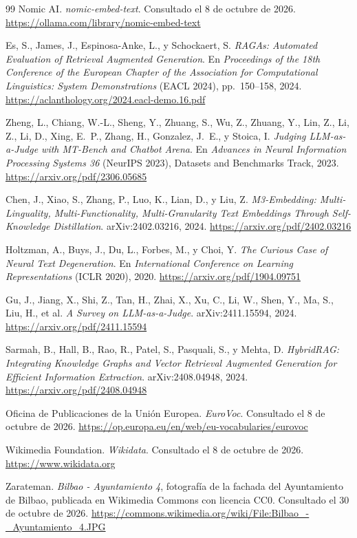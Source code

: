 \documentclass[11pt, a4paper]{report}
\begin{document}
\begin{thebibliography}{99}
		Nomic AI.
		\textit{nomic-embed-text}. Consultado el 8 de octubre de 2026.
		\url{https://ollama.com/library/nomic-embed-text}

		Es, S., James, J., Espinosa-Anke, L., y Schockaert, S.
		\textit{RAGAs: Automated Evaluation of Retrieval Augmented
		Generation}. En \textit{Proceedings of the 18th Conference of the
		European Chapter of the Association for Computational Linguistics:
		System Demonstrations} (EACL 2024), pp.~150--158, 2024.
		\url{https://aclanthology.org/2024.eacl-demo.16.pdf}

		Zheng, L., Chiang, W.-L., Sheng, Y., Zhuang, S., Wu, Z., Zhuang, Y.,
		Lin, Z., Li, Z., Li, D., Xing, E.~P., Zhang, H., Gonzalez, J.~E., y
		Stoica, I.
		\textit{Judging LLM-as-a-Judge with MT-Bench and Chatbot Arena}. En
		\textit{Advances in Neural Information Processing Systems 36}
		(NeurIPS 2023), Datasets and Benchmarks Track, 2023.
		\url{https://arxiv.org/pdf/2306.05685}

		Chen, J., Xiao, S., Zhang, P., Luo, K., Lian, D., y Liu, Z.
		\textit{M3-Embedding: Multi-Linguality, Multi-Functionality,
		Multi-Granularity Text Embeddings Through Self-Knowledge
		Distillation}. arXiv:2402.03216, 2024.
		\url{https://arxiv.org/pdf/2402.03216}

		Holtzman, A., Buys, J., Du, L., Forbes, M., y Choi, Y.
		\textit{The Curious Case of Neural Text Degeneration}. En
		\textit{International Conference on Learning Representations} (ICLR
		2020), 2020.
		\url{https://arxiv.org/pdf/1904.09751}

		Gu, J., Jiang, X., Shi, Z., Tan, H., Zhai, X., Xu, C., Li, W., Shen,
		Y., Ma, S., Liu, H., et al.
		\textit{A Survey on LLM-as-a-Judge}. arXiv:2411.15594, 2024.
		\url{https://arxiv.org/pdf/2411.15594}

		Sarmah, B., Hall, B., Rao, R., Patel, S., Pasquali, S., y Mehta, D.
		\textit{HybridRAG: Integrating Knowledge Graphs and Vector Retrieval
		Augmented Generation for Efficient Information Extraction}.
		arXiv:2408.04948, 2024.
		\url{https://arxiv.org/pdf/2408.04948}

		Oficina de Publicaciones de la Unión Europea.
		\textit{EuroVoc}. Consultado el 8 de octubre de 2026.
		\url{https://op.europa.eu/en/web/eu-vocabularies/eurovoc}

		Wikimedia Foundation.
		\textit{Wikidata}. Consultado el 8 de octubre de 2026.
		\url{https://www.wikidata.org}

		Zarateman.
		\textit{Bilbao - Ayuntamiento 4}, fotografía de la fachada del Ayuntamiento de Bilbao, publicada en Wikimedia Commons con licencia CC0. Consultado el 30 de octubre de 2026.
		\url{https://commons.wikimedia.org/wiki/File:Bilbao_-_Ayuntamiento_4.JPG}

	\end{thebibliography}
\end{document}
